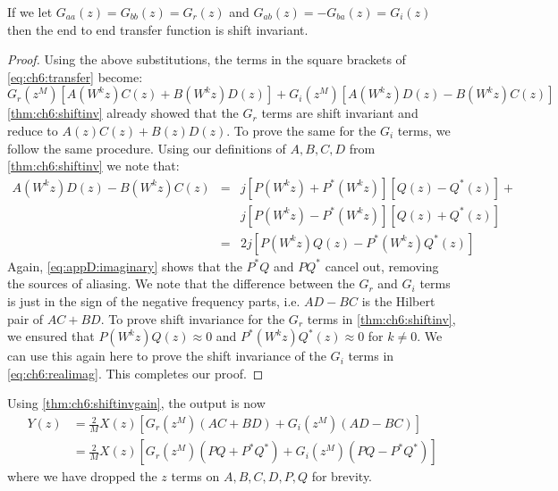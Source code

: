 \begin{theorem}\label{thm:ch6:shiftinvgain}
  If we let $G_{aa}(z) = G_{bb}(z) = G_r(z)$ and $G_{ab}(z) = -G_{ba}(z) = G_i(z)$
  then the end to end transfer function is shift invariant. 
\end{theorem}
\begin{proof}
  Using the above substitutions, the terms in the square brackets of
  \eqref{eq:ch6:transfer} become:
  \begin{equation}\label{eq:ch6:realimag}
    G_r(z^M)\left[A(W^kz)C(z) + B(W^kz)D(z)\right] + G_i(z^M)\left[A(W^kz)D(z) - B(W^kz)C(z)\right]
  \end{equation}
  \autoref{thm:ch6:shiftinv} already showed that the $G_r$ terms are shift
  invariant and reduce to $A(z)C(z) + B(z)D(z)$. To prove the same for the $G_i$
  terms, we follow the same procedure. Using our definitions of $A, B, C, D$
  from \autoref{thm:ch6:shiftinv} we note that:
  \begin{eqnarray}
    A(W^kz)D(z) - B(W^kz)C(z) &=& j\left[P(W^kz) + P^*(W^kz)\right]\left[Q(z) -Q^*(z)\right] +\\
                              &&j\left[P(W^kz) -P^*(W^kz)\right]\left[Q(z) + Q^*(z)\right] \\
                              &=& 2j\left[P(W^kz)Q(z) - P^*(W^kz)Q^*(z)\right] \label{eq:appD:imaginary}
  \end{eqnarray}
  Again, \eqref{eq:appD:imaginary} shows that the $P^*Q$ and $PQ^*$ cancel out,
  removing the sources of aliasing.
  We note that the difference
  between the $G_r$ and $G_i$ terms is just in the sign of the negative
  frequency parts, i.e. $AD - BC$ is the Hilbert pair of $AC+BD$. To prove shift
  invariance for the $G_r$ terms in \autoref{thm:ch6:shiftinv}, we ensured that
  $P(W^kz)Q(z) \approx 0$ and $P^*(W^kz)Q^*(z) \approx 0$ for $k\neq 0$. We can
  use this again here to prove the shift invariance of the $G_i$ terms in
  \eqref{eq:ch6:realimag}. This completes our proof.
\end{proof}

Using \autoref{thm:ch6:shiftinvgain}, the output is now
\begin{align}
  Y(z) &= \frac{2}{M} X(z) \left[G_r(z^{M}) \left(AC + BD\right)
  + G_i(z^{M}) \left(AD - BC\right) \right] \\
  &= \frac{2}{M}X(z)\left[G_r(z^{M}) \left(PQ + P^*Q^*\right)
  + G_i(z^{M}) \left(PQ - P^*Q^*\right) \right]  \label{eq:ch6:end2end}
\end{align}
where we have dropped the $z$ terms on $A, B, C, D, P, Q$ for brevity.

